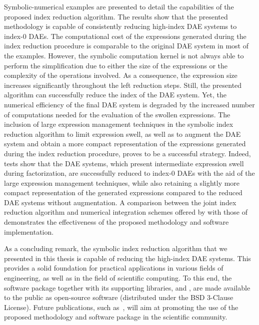 Symbolic-numerical examples are presented to detail the capabilities of the proposed index reduction algorithm. The results show that the presented methodology is capable of consistently reducing high-index \ac{DAE} systems to index-0 \acp{DAE}. The computational cost of the expressions generated during the index reduction procedure is comparable to the original \ac{DAE} system in most of the examples. However, the \Maple{} symbolic computation kernel is not always able to perform the simplification due to either the size of the expressions or the complexity of the operations involved. As a consequence, the expression size increases significantly throughout the left reduction steps. Still, the presented algorithm can successfully reduce the index of the \ac{DAE} system. Yet, the numerical efficiency of the final \ac{DAE} system is degraded by the increased number of computations needed for the evaluation of the swollen expressions. The inclusion of large expression management techniques in the symbolic index reduction algorithm to limit expression swell, as well as to augment the \ac{DAE} system and obtain a more compact representation of the expressions generated during the index reduction procedure, proves to be a successful strategy. Indeed, tests show that the \ac{DAE} systems, which present intermediate expression swell during factorization, are successfully reduced to index-0 \acp{DAE} with the aid of the large expression management techniques, while also retaining a slightly more compact representation of the generated expressions compared to the reduced \ac{DAE} systems without augmentation. A comparison between the joint index reduction algorithm and numerical integration schemes offered by \Maple{} with those of \Indigo{} demonstrates the effectiveness of the proposed methodology and software implementation.

As a concluding remark, the symbolic index reduction algorithm that we presented in this thesis is capable of reducing the high-index \ac{DAE} systems. This provides a solid foundation for practical applications in various fields of engineering, as well as in the field of scientific computing. To this end, the \Indigo{} software package together with its supporting libraries, \LEM{} and \LAST{}, are made available to the public as open-source software (distributed under the BSD 3-Clause License). Future publications, such as~\cite{stocco2024imece_solution}, will aim at promoting the use of the proposed methodology and software package in the scientific community.


